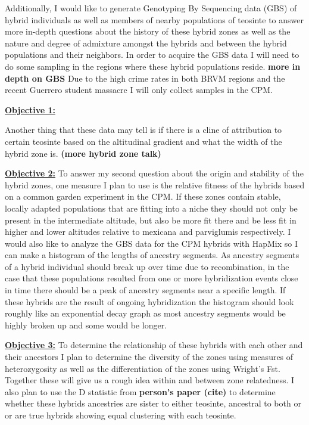 \documentclass[12pt]{amsart}
\newcommand{\mbh}[1]{\textcolor{red}{ \emph{\scriptsize  #1}} }
\begin{document}
Additionally, I would like to generate Genotyping By Sequencing data (GBS) of hybrid individuals as well as members of nearby populations of teosinte to answer more in-depth questions about the history of these hybrid zones as well as the nature and degree of admixture amongst the hybrids and between the hybrid populations and their neighbors.  %
In order to acquire the GBS data I will need to do some sampling in the regions where these hybrid populations reside.  
\textbf{more in depth on GBS}
Due to the high crime rates in both BRVM regions and the recent Guerrero student massacre I will only collect samples in the CPM.%

\hfill\break \textbf{\underline{Objective 1:} } 

Another thing that these data may tell is if there is a cline of attribution to certain teosinte based on the altitudinal gradient and what the width of the hybrid zone is. \textbf{(more hybrid zone talk)}

\hfill\break \textbf{\underline{Objective 2:} }To answer my second question about the origin and stability of the hybrid zones, one measure I plan to use is the relative fitness of the hybrids based on a common garden experiment in the CPM. 
If these zones contain stable, locally adapted populations that are fitting into a niche they should not only be present in the intermediate altitude, but also be more fit there and be less fit in higher and lower altitudes relative to mexicana and parviglumis respectively.
I would also like to analyze the GBS data for the CPM hybrids with HapMix so I can make a histogram of the lengths of ancestry segments.
As ancestry segments of a hybrid individual should break up over time due to recombination, in the case that these populations resulted from one or more hybridization events close in time there should be a peak of ancestry segments near a specific length.
If these hybrids are the result of ongoing hybridization the histogram should look roughly like an exponential decay graph as most ancestry segments would be highly broken up and some would be longer.%

\hfill\break \textbf{\underline{Objective 3:} } To determine the relationship of these hybrids with each other and their ancestors I plan to determine the diversity of the zones using measures of heterozygosity as well as the differentiation of the zones using Wright's Fst.  
Together these will give us a rough idea within and between zone relatedness.
I also plan to use the D statistic from \textbf{person's paper (cite)} to determine whether these hybrids ancestries are sister to either teosinte, ancestral to both or or are true hybrids showing equal clustering with each teosinte.
\end{document}
